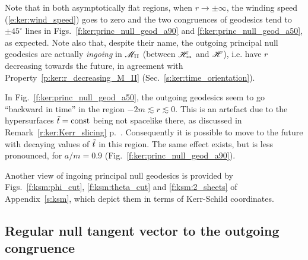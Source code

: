 Note that in both asymptotically flat regions, when $r\rightarrow \pm\infty$,
the winding speed (\ref{e:ker:wind_speed}) goes to zero
and the two congruences of geodesics tend to $\pm 45^\circ$ lines
in Figs.~\ref{f:ker:princ_null_geod_a90} and
\ref{f:ker:princ_null_geod_a50}, as expected.
Note also that, despite their name, the outgoing principal null geodesics are actually
\emph{ingoing} in $\mathscr{M}_{\rm II}$ (between $\mathscr{H}_{\rm in}$ and $\mathscr{H}$), i.e. have $r$ decreasing
towards the future, in agreement with Property~\ref{p:ker:r_decreasing_M_II}
(Sec.~\ref{s:ker:time_orientation}).

\begin{remark}
In Fig.~\ref{f:ker:princ_null_geod_a50},
the outgoing geodesics seem to go ``backward in time'' in the region $-2m \lesssim r \lesssim 0$. This
is an artefact due to the hypersurfaces ${\tilde t} = \mathrm{const}$ being not spacelike
there, as discussed in Remark~\ref{r:ker:Kerr_slicing}
p.~\pageref{r:ker:Kerr_slicing}.
Consequently it is possible to move to the future with decaying values
of ${\tilde t}$ in this region.
The same effect exists, but is less pronounced, for $a/m=0.9$ (Fig.~\ref{f:ker:princ_null_geod_a90}).
\end{remark}

Another view of ingoing principal null geodesics is provided by Figs.~\ref{f:ksm:phi_cut},
\ref{f:ksm:theta_cut} and \ref{f:ksm:2_sheets} of Appendix~\ref{s:ksm}, which
depict them in terms of Kerr-Schild coordinates.

\subsection{Regular null tangent vector to the outgoing congruence}

